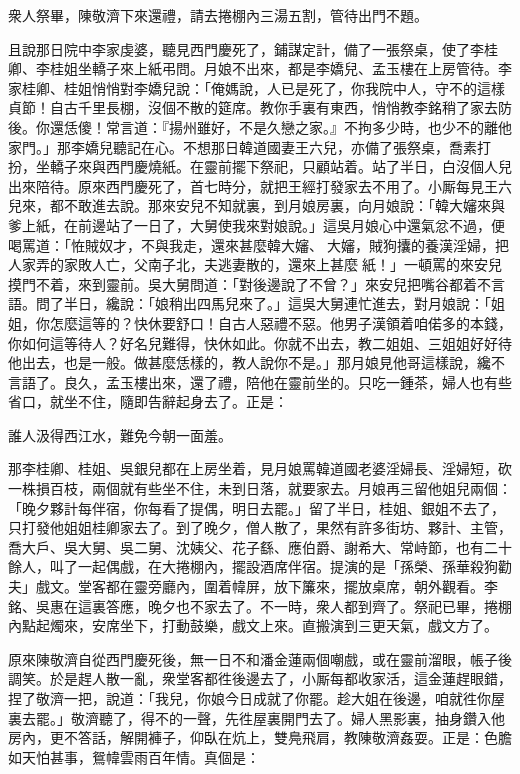 衆人祭畢，陳敬濟下來還禮，請去捲棚內三湯五割，管待出門不題。

且說那日院中李家虔婆，聽見西門慶死了，鋪謀定計，{}備了一張祭桌，使了李桂卿、李桂姐坐轎子來上紙弔問。月娘不出來，都是李嬌兒、孟玉樓在上房管待。李家桂卿、桂姐悄悄對李嬌兒說：「俺媽說，人已是死了，你我院中人，守不的這樣貞節！自古千里長棚，沒個不散的筵席。教你手裏有東西，悄悄教李銘稍了家去防後。你還恁傻！常言道：『揚州雖好，不是久戀之家。』不拘多少時，也少不的離他家門。」那李嬌兒聽記在心。不想那日韓道國妻王六兒，亦備了張祭桌，喬素打扮，坐轎子來與西門慶燒紙。在靈前擺下祭祀，只顧站着。站了半日，白沒個人兒出來陪待。原來西門慶死了，首七時分，就把王經打發家去不用了。小厮每見王六兒來，都不敢進去說。那來安兒不知就裏，到月娘房裏，向月娘說：「韓大嬸來與爹上紙，在前邊站了一日了，大舅使我來對娘說。」這吳月娘心中還氣忿不過，便喝罵道：「恠賊奴才，不與我走，還來甚麼韓大嬸、𣭈大嬸，賊狗攮的養漢淫婦，把人家弄的家敗人亡，父南子北，夫逃妻散的，還來上甚麼𣭈紙！」一頓罵的來安兒摸門不着，來到靈前。吳大舅問道：「對後邊說了不曾？」來安兒把嘴谷都着不言語。問了半日，纔說：「娘稍出四馬兒來了。」這吳大舅連忙進去，對月娘說：「姐姐，你怎麼這等的？快休要舒口！自古人惡禮不惡。他男子漢領着咱偌多的本錢，你如何這等待人？好名兒難得，快休如此。你就不出去，教二姐姐、三姐姐好好待他出去，也是一般。做甚麼恁樣的，教人說你不是。」那月娘見他哥這樣說，纔不言語了。良久，孟玉樓出來，還了禮，陪他在靈前坐的。只吃一鍾茶，婦人也有些省口，就坐不住，隨即告辭起身去了。正是：

\begin{myquote}
誰人汲得西江水，難免今朝一面羞。
\end{myquote}

那李桂卿、桂姐、吳銀兒都在上房坐着，見月娘罵韓道國老婆淫婦長、淫婦短，砍一株損百枝，兩個就有些坐不住，未到日落，就要家去。月娘再三留他姐兒兩個：「晚夕夥計每伴宿，你每看了提偶，明日去罷。」留了半日，桂姐、銀姐不去了，只打發他姐姐桂卿家去了。到了晚夕，僧人散了，果然有許多街坊、夥計、主管，喬大戶、吳大舅、吳二舅、沈姨父、花子繇、應伯爵、謝希大、常峙節，也有二十餘人，叫了一起偶戲，在大捲棚內，擺設酒席伴宿。提演的是「孫榮、孫華殺狗勸夫」戲文。堂客都在靈旁廳內，圍着幃屏，放下簾來，擺放桌席，朝外觀看。李銘、吳惠在這裏答應，晚夕也不家去了。不一時，衆人都到齊了。祭祀已畢，捲棚內點起燭來，安席坐下，打動鼓樂，戲文上來。直搬演到三更天氣，戲文方了。

原來陳敬濟自從西門慶死後，無一日不和潘金蓮兩個嘲戲，或在靈前溜眼，帳子後調笑。於是趕人散一亂，衆堂客都徃後邊去了，小厮每都收家活，這金蓮趕眼錯，捏了敬濟一把，說道：「我兒，你娘今日成就了你罷。趁大姐在後邊，咱就徃你屋裏去罷。」敬濟聽了，得不的一聲，先徃屋裏開門去了。婦人黑影裏，抽身鑽入他房內，更不答話，解開褲子，仰臥在炕上，{}雙鳧飛肩，教陳敬濟姦耍。正是：色膽如天怕甚事，鴛幃雲雨百年情。真個是：

